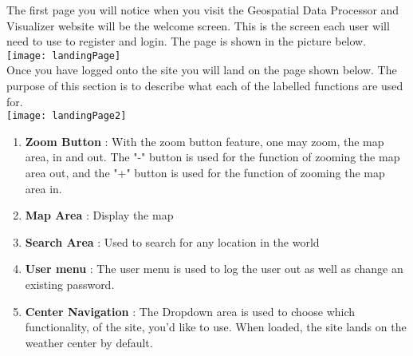 The first page you will notice when you visit the Geospatial Data Processor and Visualizer website will be the welcome screen. This is the screen each user will need to use to register and login. The page is shown in the picture below.\\[0.5cm]
\texttt{[image: landingPage]} \\[0.5cm]


Once you have logged onto the site you will land on the page shown below. The purpose of this section is to describe what each of the labelled functions are used for. \\[0.5cm]
\texttt{[image: landingPage2]} \\[0.5cm]

\begin{enumerate}
	\item \textbf{Zoom Button} : With the zoom button feature, one may zoom, the map area, in and out. The "-" button is used for the function of zooming the map area out, and the "+" button is used for the function of zooming the map area in.
	\item \textbf{Map Area} : Display the map
	\item \textbf{Search Area} : Used to search for any location in the world
	\item \textbf{User menu} : The user menu is used to log the user out as well as change an existing password.
	\item \textbf{Center Navigation} : The Dropdown area is used to choose which functionality, of the site, you'd like to use. When loaded, the site lands on the weather center by default.
\end{enumerate}
